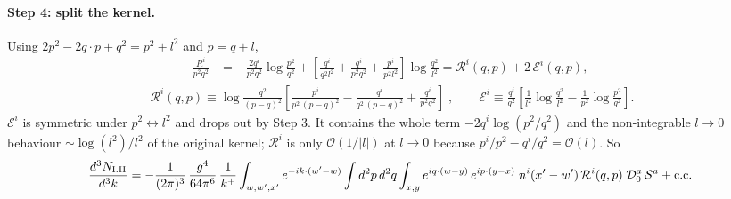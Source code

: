\documentclass[10pt]{article}
\numberwithin{equation}{section}
\begin{document}
\paragraph{Step 4: split the kernel.} Using $2p^{2}-2q\cdot p+q^{2}=p^{2}+l^{2}$ and $p=q+l$,
\begin{align}
\frac{R^{i}}{p^{2}q^{2}}&=-\frac{2q^{i}}{p^{2}q^{2}}\log\frac{p^{2}}{q^{2}}+\left[\frac{q^{i}}{q^{2}l^{2}}+\frac{q^{i}}{p^{2}q^{2}}+\frac{p^{i}}{p^{2}l^{2}}\right]\log\frac{q^{2}}{l^{2}}
=\mathcal{R}^{i}(q,p)+2\,\mathcal{E}^{i}(q,p),
\end{align}
\begin{align}
\boxed{\;\mathcal{R}^{i}(q,p)\equiv\log\frac{q^{2}}{(p-q)^{2}}\left[\frac{p^{i}}{p^{2}\,(p-q)^{2}}-\frac{q^{i}}{q^{2}\,(p-q)^{2}}+\frac{q^{i}}{p^{2}q^{2}}\right]\;},\qquad
\mathcal{E}^{i}\equiv\frac{q^{i}}{q^{2}}\left[\frac{1}{l^{2}}\log\frac{q^{2}}{l^{2}}-\frac{1}{p^{2}}\log\frac{p^{2}}{q^{2}}\right]. \label{eq:calR}
\end{align}
$\mathcal{E}^{i}$ is symmetric under $p^{2}\leftrightarrow l^{2}$ and drops out by Step 3. It contains the whole term $-2q^{i}\log(p^{2}/q^{2})$ and the non-integrable $l\to0$ behaviour $\sim\log(l^{2})/l^{2}$ of the original kernel; $\mathcal{R}^{i}$ is only $\mathcal{O}(1/|l|)$ at $l\to0$ because $p^{i}/p^{2}-q^{i}/q^{2}=\mathcal{O}(l)$. So
\begin{align}
\frac{d^{3}N_{\rm I.II}}{d^{3}k}=-\frac{1}{(2\pi)^{3}}\,\frac{g^{4}}{64\pi^{6}}\,\frac{1}{k^{+}}\int_{w,w',x'}e^{-ik\cdot(w'-w)}\int d^{2}p\,d^{2}q\int_{x,y}e^{iq\cdot(w-y)}\,e^{ip\cdot(y-x)}\;n^{i}(x'-w')\,\mathcal{R}^{i}(q,p)\;\mathcal{D}_{0}^{a}\,\mathcal{S}^{a}+{\rm c.c.} \label{eq:RowIImom}
\end{align}
\end{document}
